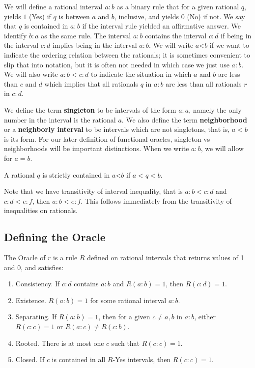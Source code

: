 \documentclass[12pt]{article}
\theoremstyle{remark}
\newcommand{\lt}{\mathord{<}}
\begin{document}
We will define a rational interval $a:b$ as a binary rule that for a given rational $q$, yields $1$ (Yes) if $q$ is between $a$ and $b$, inclusive, and yields $0$ (No) if not. We say that $q$ is contained in $a:b$ if the interval rule yielded an affirmative answer.  We identify $b:a$ as the same rule. The interval $a:b$ contains the interval $c:d$ if being in the interval $c:d$ implies being in the interval $a:b$. We will write $a\lt b$ if we want to indicate the ordering relation between the rationals; it is sometimes convenient to slip that into notation, but it is often not needed in which case we just use $a:b$. We will also write $a:b < c:d$ to indicate the situation in which $a$ and $b$ are less than $c$ and $d$ which implies that all rationals $q$ in $a:b$ are less than all rationals $r$ in $c:d$.

We define the term \textbf{singleton} to be intervals of the form $a:a$, namely the only number in the interval is the rational $a$. We also define the term \textbf{neighborhood} or a \textbf{neighborly interval} to be intervals which are not singletons, that is, $a < b$ is its form. For our later definition of functional oracles, singleton vs neighborhoods will be important distinctions. When we write $a:b$, we will allow for $a=b$.

A rational $q$ is strictly contained in $a\lt b$ if $a < q < b$. 

Note that we have transitivity of interval inequality, that is $a:b < c:d$ and $c:d < e:f$, then $a:b < e:f$. This follows immediately from the transitivity of inequalities on rationals.

\subsection{Defining the Oracle}

The Oracle of $r$ is a rule $R$ defined on rational intervals that returns values of 1 and 0, and satisfies: 
\begin{enumerate}
    \item Consistency. If $c:d$ contains $a:b$ and $R(a:b) = 1$, then $R(c:d) = 1$.
    \item Existence. $R(a:b) = 1$ for some rational interval $a:b$.
    \item Separating. If $R(a:b)=1$, then for a given $c \neq a, b$ in $a:b$, either $R(c:c) = 1$ or $R(a:c) \neq R(c:b)$. 
    \item Rooted. There is at most one $c$ such that $R(c:c) =1$.
    \item Closed. If $c$ is contained in all $R$-Yes intervals, then $R(c:c) = 1$.
\end{enumerate}
\end{document}
